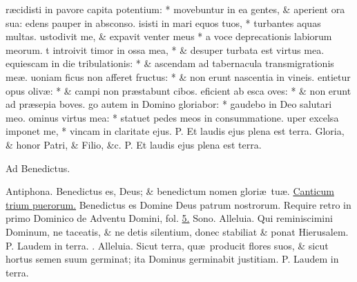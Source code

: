 \documentclass[letter,11pt]{book}
\makeatletter
\DeclareRobustCommand{\Vbar}{\vers@resp{-0.1em}{V}}
\newcommand{\vers@resp@sym}{\raisebox{0.2ex}{\rotatebox[origin=c]{-20}{$\m@th\rceil$}}}
\newcommand{\vers@resp}[2]{%
  {\ooalign{\hidewidth\kern#1\vers@resp@sym\hidewidth\cr#2\cr}}%
}%
\def\P{\color{Red} P. \color{black}}
\def\V{\color{Red} \Vbar . \color{black}}
\makeatother
\begin{document}
\begin{multicols}{2}
r\ae cidisti in pavore capita potentium: * movebuntur in ea gentes, \& aperient ora sua: edens pauper in absconso.
isisti in mari equos tuos, * turbantes aquas multas.
ustodivit me, \& expavit venter meus * a voce deprecationis labiorum meorum.
t introivit timor in ossa mea, * \& desuper turbata est virtus mea.
equiescam in die tribulationis: * \& ascendam ad tabernacula transmigrationis me\ae .
uoniam ficus non afferet fructus: * \& non erunt nascentia in vineis.
entietur opus oliv\ae : * \& campi non pr\ae stabunt cibos.
eficient ab esca oves: * \& non erunt ad pr\ae sepia boves.
go autem in Domino gloriabor: * gaudebo in Deo salutari meo.
ominus virtus mea: * statuet pedes meos in consummatione.
uper excelsa imponet me, * vincam in claritate ejus.
\newline \P Et laudis ejus plena est terra. Gloria, \& honor Patri, \& Filio, \&c. \P Et laudis ejus plena est terra.
\vspace{-.5em} \begin{center} \color{Red} Ad Benedictus. \end{center} \vspace{-.5em}
\par \noindent \color{Red} Antiphona. \color{black} Benedictus es, Deus; \& benedictum nomen glori\ae \ tu\ae . \color{Red} \hyperlink{benedictus}{Canticum trium puerorum.} \color{black} Benedictus es Domine Deus patrum nostrorum. \color{Red} Require retro in primo Dominico de Adventu Domini, fol. \color{black} \hyperlink{page.5}{5.}
\newline \color{Red} Sono. \color{black} Alleluia. Qui reminiscimini Dominum, ne taceatis, \& ne detis silentium, donec stabiliat \& ponat Hierusalem. \P Laudem in terra. \V Alleluia. Sicut terra, qu\ae \ producit flores suos, \& sicut hortus semen suum germinat; ita Dominus germinabit justitiam. \P Laudem in terra.

\end{multicols}
\end{document}
